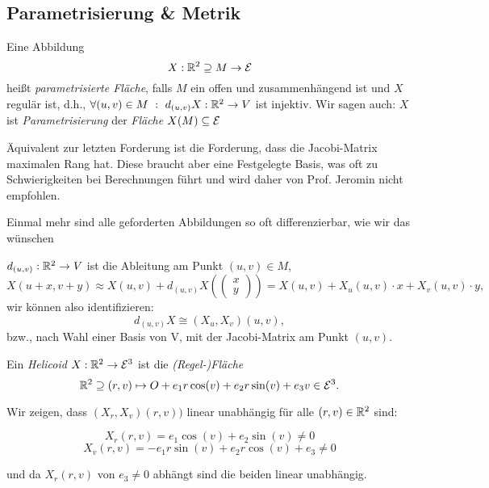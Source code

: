 
\subsection{Parametrisierung \& Metrik}
\begin{definition}
	

Eine Abbildung \[ X:\mathbb R^2 \supseteq M \rightarrow \mathcal E \] heißt \emph{parametrisierte Fläche}, falls $M$ ein offen und zusammenhängend ist und $X$ regulär ist, d.h., $  \forall(u,v) \in M~:~d_{(u,v)}X: \mathbb R^2 \rightarrow V $ ist injektiv.
Wir sagen auch: $  X  $ ist \emph{Parametrisierung} der \emph{Fläche} $ X(M) \subseteq \mathcal E $

\end{definition}

\begin{remark}
	
 Äquivalent zur letzten Forderung ist die Forderung, dass die Jacobi-Matrix maximalen Rang hat. Diese braucht aber eine Festgelegte Basis, was oft zu Schwierigkeiten bei Berechnungen führt und wird daher von Prof. Jeromin nicht empfohlen.

\end{remark}

\begin{remark}
	Einmal mehr sind alle geforderten Abbildungen so oft differenzierbar, wie wir das wünschen
\end{remark}

\begin{remark}
	
	$ d_{(u,v)} : \mathbb R^2 \rightarrow V$ ist die Ableitung am Punkt $ (u,v) \in M $, \[X(u+x,v+y) \approx X(u,v) + d_{(u,v)}  X(\begin{pmatrix}
	x\\
	y
	\end{pmatrix}) = X(u,v) + X_u(u,v)\cdot x + X_v(u,v)\cdot y,  \]
	wir können also identifizieren: \[ d_{(u,v)}X \cong (X_u,X_v)(u,v), \]
	bzw., nach Wahl einer Basis von V, mit der Jacobi-Matrix am Punkt $ (u,v) $.
	
\end{remark}

\begin{example}
	


Ein \emph{Helicoid} $ X: \mathbb R^2 \rightarrow \mathcal E^3 $ ist die \emph{(Regel-)Fläche}  
\[ \mathbb R^2 \supseteq (r,v) \mapsto O + e_1r \cos(v) + e_2 r \sin(v) + e_3 v \in \mathcal E^3. \]

Wir zeigen, dass $(X_r,X_v)(r,v))$ linear unabhängig für alle $ (r,v) \in \mathbb R^2 $ sind:

\[ X_r(r,v) = e_1\cos(v) + e_2 \sin(v) \neq 0 \]
\[ X_v(r,v) = -e_1r \sin(v) + e_2 r \cos(v) + e_3 \neq 0 \]

und da $ X_r(r,v) $ von $e_3 \neq 0$  abhängt sind die beiden linear unabhängig.

\end{example}


